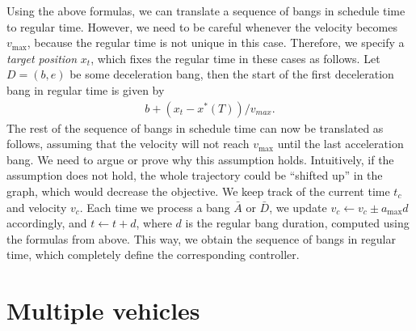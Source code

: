 \documentclass[a4paper]{article}
\theoremstyle{definition}
\theoremstyle{plain}
\begin{document}
Using the above formulas, we can translate a sequence of bangs in schedule time
to regular time. However, we need to be careful whenever the velocity becomes
$v_{\max}$, because the regular time is not unique in this case. Therefore, we
specify a \textit{target position} $x_{t}$, which fixes the regular time in
these cases as follows. Let $D=(b,e)$ be some deceleration bang, then the start
of the first deceleration bang in regular time is given by
\begin{align*}
  b + (x_{t} - x^{*}(T)) / v_{max} .
\end{align*}
%
The rest of the sequence of bangs in schedule time can now be translated as
follows, assuming that the velocity will not reach $v_{\max}$ until the last
acceleration bang. {\color{blue} We need to argue or prove why this assumption
  holds. Intuitively, if the assumption does not hold, the whole trajectory
  could be ``shifted up'' in the graph, which would decrease the objective.} We
keep track of the current time $t_{c}$ and velocity $v_{c}$. Each time we
process a bang $\bar{A}$ or $\bar{D}$, we update $v_{c} \leftarrow v_{c} \pm a_{\max} d$
accordingly, and $t \leftarrow t + d$, where $d$ is the regular bang duration, computed
using the formulas from above. This way, we obtain the sequence of bangs in
regular time, which completely define the corresponding controller.


\section*{Multiple vehicles}
\end{document}
